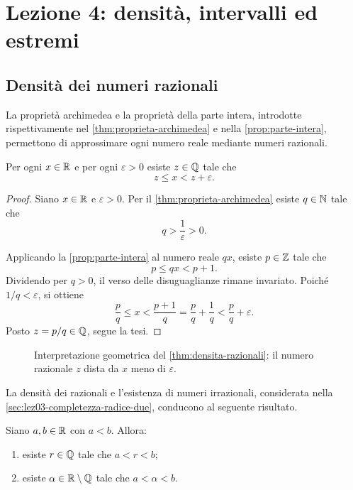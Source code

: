 \chapter[Lezione 4 --- 2 ottobre 2026]{Lezione 4: densità, intervalli ed estremi}
\label{chap:lezione-04}

\section{Densità dei numeri razionali}
\label{sec:lez04-densita-razionali}

La proprietà archimedea e la proprietà della parte intera, introdotte
rispettivamente nel \cref{thm:proprieta-archimedea} e nella
\cref{prop:parte-intera}, permettono di approssimare ogni numero
reale mediante numeri razionali.

\begin{theorem}[Densità di \(\Q\) in \(\R\)]
\label{thm:densita-razionali}
Per ogni \(x\in\mathbb{R}\) e per ogni \(\varepsilon>0\) esiste \(z\in\mathbb{Q}\)
tale che
\[
  z\le x<z+\varepsilon.
\]
\end{theorem}

\begin{proof}
Siano \(x\in\mathbb{R}\) e \(\varepsilon>0\). Per il
\cref{thm:proprieta-archimedea} esiste \(q\in\mathbb{N}\) tale che
\[
  q>\frac{1}{\varepsilon}>0.
\]

Applicando la \cref{prop:parte-intera} al numero reale \(qx\),
esiste \(p\in\mathbb{Z}\) tale che
\[
  p\le qx<p+1.
\]
Dividendo per \(q>0\), il verso delle disuguaglianze
rimane invariato. Poiché \(1/q<\varepsilon\), si ottiene
\[
  \frac{p}{q}\le x
  <\frac{p+1}{q}
  =\frac{p}{q}+\frac{1}{q}
  <\frac{p}{q}+\varepsilon.
\]
Posto \(z=p/q\in\mathbb{Q}\), segue la tesi.
\end{proof}

\begin{figure}[htbp]
  \centering
  
  \caption{Interpretazione geometrica del \cref{thm:densita-razionali}:
  il numero razionale \(z\) dista da \(x\) meno di \(\varepsilon\).}
  \label{fig:densita-razionali}
\end{figure}

La densità dei razionali e l'esistenza di numeri irrazionali,
considerata nella \cref{sec:lez03-completezza-radice-due},
conducono al seguente risultato.

\begin{theorem}
\label{thm:razionali-irrazionali-tra-reali}
Siano \(a,b\in\mathbb{R}\) con \(a<b\). Allora:
\begin{enumerate}
  \item esiste \(r\in\mathbb{Q}\) tale che \(a<r<b\);
  \item esiste \(\alpha\in\mathbb{R}\setminus\mathbb{Q}\) tale che \(a<\alpha<b\).
\end{enumerate}
\end{theorem}

